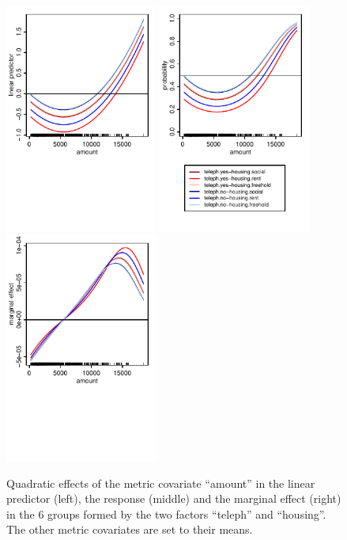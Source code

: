 \documentclass[nojss]{jss}
\newcommand{\quotes}[1]{``#1''}
\begin{document}
\begin{figure}[ht]
\centering
\includegraphics[width=5cm]{cd-amount-link-001} \includegraphics[width=5cm]{cd-amount-resp-001} \includegraphics[width=5cm]{cd-amount-marg-001}
\vspace{-0.75cm}
\caption{Quadratic effects of the metric covariate \quotes{amount} in the linear predictor (left), the response (middle) and the marginal effect (right) in the 6 groups formed by the two factors \quotes{teleph} and \quotes{housing}. The other metric covariates are set to their means.} \label{fig-cd-amount}
\end{figure}
\end{document}
